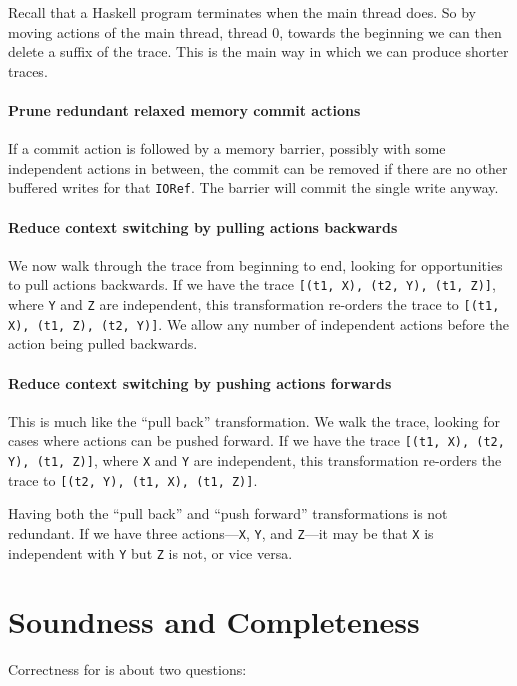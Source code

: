 Recall that a Haskell program terminates when the main thread does.
So by moving actions of the main thread, thread 0, towards the
beginning we can then delete a suffix of the trace.  This is the main
way in which we can produce shorter traces.

\paragraph{Prune redundant relaxed memory commit actions}
If a commit action is followed by a memory barrier, possibly with some
independent actions in between, the commit can be removed if there are
no other buffered writes for that \verb|IORef|.  The barrier will
commit the single write anyway.

\paragraph{Reduce context switching by pulling actions backwards}
We now walk through the trace from beginning to end, looking for
opportunities to pull actions backwards.  If we have the trace
\verb|[(t1, X), (t2, Y), (t1, Z)]|, where \verb|Y| and \verb|Z| are
independent, this transformation re-orders the trace to
\verb|[(t1, X), (t1, Z), (t2, Y)]|.  We allow any number of
independent actions before the action being pulled backwards.

\paragraph{Reduce context switching by pushing actions forwards}
This is much like the ``pull back'' transformation.  We walk the
trace, looking for cases where actions can be pushed forward.  If we
have the trace \verb|[(t1, X), (t2, Y), (t1, Z)]|, where \verb|X| and
\verb|Y| are independent, this transformation re-orders the trace to
\verb|[(t2, Y), (t1, X), (t1, Z)]|.

Having both the ``pull back'' and ``push forward'' transformations is
not redundant.  If we have three actions---\verb|X|, \verb|Y|, and
\verb|Z|---it may be that \verb|X| is independent with \verb|Y| but
\verb|Z| is not, or vice versa.

\section{Soundness and Completeness}
\label{sec:dejafu-correctness}

Correctness for \dejafu{} is about two questions:

